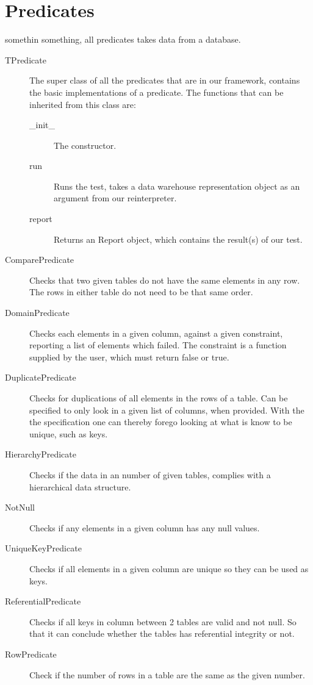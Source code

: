 \section{Predicates}
somethin something, all predicates takes data from a database.

\begin{description}
\item [TPredicate] The super class of all the predicates that are in our framework, contains the basic implementations of a predicate. The functions that can be inherited from this class are:
	\begin{description}
	\item [\_init\_ ] The constructor. 
	\item [run] Runs the test, takes a data warehouse representation object as an argument from our reinterpreter. 
	\item [report] Returns an Report object, which contains the result(s) of our test.
	\end{description}
\item [ComparePredicate] Checks that two given tables do not have the same elements in any row. The rows in either table do not need to be that same order.
\item [DomainPredicate] Checks each elements in a given column, against a given constraint, reporting a list of elements which failed. The constraint is a function supplied by the user, which must return false or true.
\item [DuplicatePredicate] Checks for duplications of all elements in the rows of a table. Can be specified to only look in a given list of columns, when provided. With the the specification one can thereby forego looking at what is know to be unique, such as keys.
\item [HierarchyPredicate] Checks if the data in an number of given tables, complies with a hierarchical data structure.
\item [NotNull] Checks if any elements in a given column has any null values.
\item [UniqueKeyPredicate] Checks if all elements in a given column are unique so they can be used as keys.
\item [ReferentialPredicate] Checks if all keys in column between 2 tables are valid and not null. So that it can conclude whether the tables has referential integrity or not.
\item [RowPredicate] Check if the number of rows in a table are the same as the given number.
\end{description}
